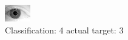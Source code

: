 \begin{figure}[h!]
\begin{center}
\includegraphics[width=0.60\columnwidth]{figures/ID2104_class_4_target_3.png}
\end{center}
\caption{ Classification: 4 actual target: 3}
\label{fig:ID2104_class_4_target_3}
\end{figure}
